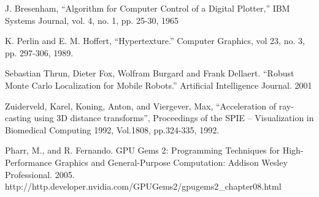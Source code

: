 \documentclass[letterpaper, 10 pt, conference]{ieeeconf}  %
\begin{document}
\begin{thebibliography}{99}

 J. Bresenham, “Algorithm for Computer Control of a Digital Plotter,” IBM Systems Journal, vol. 4, no. 1, pp. 25-30, 1965

 K. Perlin and E. M. Hoffert, “Hypertexture.” Computer Graphics, vol 23, no. 3, pp. 297-306, 1989.

 Sebastian Thrun, Dieter Fox, Wolfram Burgard and Frank Dellaert. “Robust Monte Carlo Localization for Mobile Robots.” Artificial Intelligence Journal. 2001

 Zuiderveld, Karel, Koning, Anton, and Viergever, Max, “Acceleration of ray-casting using 3D distance transforms”, Proceedings of the SPIE – Visualization in Biomedical Computing 1992, Vol.1808, pp.324-335, 1992.
 
 Pharr, M., and R. Fernando. GPU Gems 2: Programming Techniques for High-Performance Graphics and General-Purpose Computation: Addison Wesley Professional. 2005. http://http.developer.nvidia.com/GPUGems2/gpugems2\_chapter08.html

\end{thebibliography}
\end{document}
